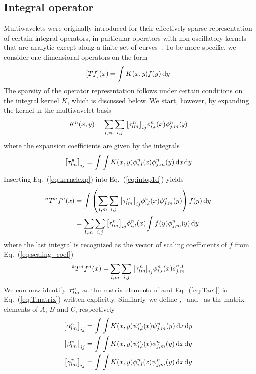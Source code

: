 \subsection{Integral operator}
Multiwavelets were originally introduced for their effectively sparse 
representation of certain integral operators, in particular operators with 
non-oscillatory kernels that are analytic except along a finite set of 
curves~\cite{Alpert:1993p5460}. To be more specific, we consider one-dimensional 
operators on the form
\begin{equation}
    \label{eq:intop1d}
    [Tf](x) = \int K(x,y) f(y) \,\mathrm{d} y
\end{equation}
The sparsity of the operator representation follows under certain conditions 
on the integral kernel $K$, which is discussed below. We start, however, by 
expanding the kernel in the multiwavelet basis
\begin{equation}
    \label{eq:kernelexp}
    K^n(x,y) = \sum_{l,m} \sum_{i,j}
	\big[\tau^n_{lm}\big]_{ij} 
	\phi_{i,l}^n(x)
	\phi_{j,m}^n(y)
\end{equation}
where the expansion coefficients are given by the integrals
\begin{equation}
    \label{eq:taudef}
    \big[\tau^n_{lm}\big]_{ij} = \int\int
	K(x,y)\phi^n_{i,l}(x)\phi^n_{j,m}(y)\,\mathrm{d} x \,\mathrm{d} y
\end{equation}
Inserting Eq.~(\ref{eq:kernelexp}) into Eq.~(\ref{eq:intop1d}) yields
\begin{align}
    ^{n}T^{n}{f}^{n}(x) &= \int\left(\sum_{l,m} \sum_{i,j}
	\big[\tau^n_{lm}\big]_{ij}
	\phi^n_{i,l}(x)
	\phi^n_{j,m}(y)
	\right)f(y)\,\mathrm{d} y\\
	&= \sum_{l,m} \sum_{i,j}
	\big[\tau^n_{lm}\big]_{ij}
	\phi^n_{i,l}(x)
	\int f(y)\phi^n_{j,m}(y)\,\mathrm{d} y
\end{align}
where the last integral is recognized as the vector of scaling coefficients of $f$ 
from Eq.~(\ref{eq:scaling_coef})
\begin{equation}
    \label{eq:Tact}
    ^{n}T^{n}{f}^{n}(x) = \sum_{l,m} \sum_{i,j} 
	\big[\tau^n_{lm}\big]_{ij}
	\phi^n_{i,l}(x)
	s^{n,f}_{j,m}
\end{equation}
We can now identify $\boldsymbol{\tau}^n_{lm}$ as the matrix elements of  
and Eq.~(\ref{eq:Tact}) is Eq.~(\ref{eq:Tmatrix}) written explicitly. 
Similarly, we define \alphamat, \betamat\ and \gammamat\ as the matrix 
elements of $A$, $B$ and $C$, respectively
\begin{align}
    \label{eq:tcbadef}
    \big[\alpha^n_{lm}\big]_{ij} &= \int\int
	K(x,y)\psi^n_{i,l}(x)\psi^n_{j,m}(y)\,\mathrm{d} x \,\mathrm{d} y\\
    \big[\beta^n_{lm}\big]_{ij} &= \int\int
	K(x,y)\psi^n_{i,l}(x)\phi^n_{j,m}(y)\,\mathrm{d} x \,\mathrm{d} y\\
    \big[\gamma^n_{lm}\big]_{ij} &= \int\int
	K(x,y)\phi^n_{i,l}(x)\psi^n_{j,m}(y)\,\mathrm{d} x \,\mathrm{d} y
\end{align}
